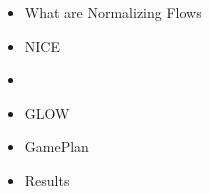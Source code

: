 \begin{frame}
\begin{itemize}
    \item What are Normalizing Flows
    \item NICE
    \item \textbf{\color{red}{RealNVP}}
    \item GLOW
    \item GamePlan
    \item Results
\end{itemize}
\end{frame}
